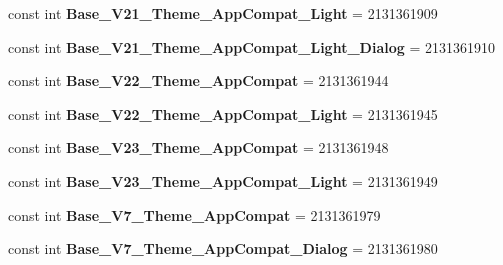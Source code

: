 \begin{DoxyCompactItemize}
const int {\bfseries Base\+\_\+\+V21\+\_\+\+Theme\+\_\+\+App\+Compat\+\_\+\+Light} = 2131361909
\item 
\mbox{\label{class_sample_app_1_1_droid_1_1_resource_1_1_style_af204499eba07402b9cbc7e70f552373d}} 
const int {\bfseries Base\+\_\+\+V21\+\_\+\+Theme\+\_\+\+App\+Compat\+\_\+\+Light\+\_\+\+Dialog} = 2131361910
\item 
\mbox{\label{class_sample_app_1_1_droid_1_1_resource_1_1_style_a4610c36a9813ee433f5fb95fac9d6365}} 
const int {\bfseries Base\+\_\+\+V22\+\_\+\+Theme\+\_\+\+App\+Compat} = 2131361944
\item 
\mbox{\label{class_sample_app_1_1_droid_1_1_resource_1_1_style_a801ac73d9b8460b6e4376316d87ed1f3}} 
const int {\bfseries Base\+\_\+\+V22\+\_\+\+Theme\+\_\+\+App\+Compat\+\_\+\+Light} = 2131361945
\item 
\mbox{\label{class_sample_app_1_1_droid_1_1_resource_1_1_style_aa07768c792e185173cfcd7ba864c35bc}} 
const int {\bfseries Base\+\_\+\+V23\+\_\+\+Theme\+\_\+\+App\+Compat} = 2131361948
\item 
\mbox{\label{class_sample_app_1_1_droid_1_1_resource_1_1_style_ab4ee8afac6882073d62622c80a12226b}} 
const int {\bfseries Base\+\_\+\+V23\+\_\+\+Theme\+\_\+\+App\+Compat\+\_\+\+Light} = 2131361949
\item 
\mbox{\label{class_sample_app_1_1_droid_1_1_resource_1_1_style_a6ae66b0955a2e7baa6ee0ff19ee6c6b4}} 
const int {\bfseries Base\+\_\+\+V7\+\_\+\+Theme\+\_\+\+App\+Compat} = 2131361979
\item 
\mbox{\label{class_sample_app_1_1_droid_1_1_resource_1_1_style_ab278acdde98ab3fff4fdc44f8ef047db}} 
const int {\bfseries Base\+\_\+\+V7\+\_\+\+Theme\+\_\+\+App\+Compat\+\_\+\+Dialog} = 2131361980
\item 
\mbox{\label{class_sample_app_1_1_droid_1_1_resource_1_1_style_ad90f5a5d732a0d30a735714344cdbc82}} 

\end{DoxyCompactItemize}
